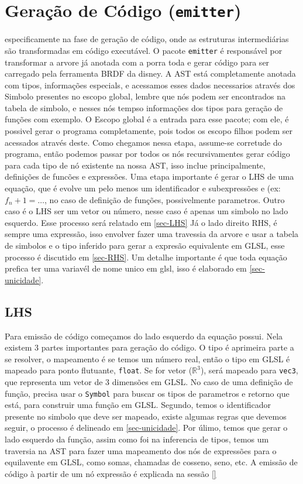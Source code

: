 
\section{Geração de Código (\texttt{emitter})}

especificamente na fase de geração de código, onde as estruturas intermediárias são transformadas em código executável.
O pacote \texttt{emitter} é responsável por transformar a arvore já anotada com a porra toda e gerar código para ser carregado pela ferramenta BRDF da disney.
A AST está completamente anotada com tipos, informações especials, e acessamos esses dados necessarios através dos Simbolo presentes no escopo global, lembre que nós podem ser encontrados na tabela de simbolo, e nesses nós tempso informações dos tipos para geração de funções com exemplo. O Escopo global é a entrada para esse pacote; com ele, é possivel gerar o programa completamente, pois todos os escopo filhos podem ser acessados através deste.
Como chegamos nessa etapa, assume-se corretude do programa, então podemos passar por todos os nós recursivamentes gerar código para cada tipo de nó existente na nossa AST, isso inclue principalmente, definições de funcões e expressões. Uma etapa importante é gerar o LHS de uma equação, que é evolve um pelo menos um identificador e subexpressões e (ex: $f_n+1 = \dots$, no caso de definição de funções, possivelmente parametros. Outro caso é o LHS ser um vetor ou número, nesse caso é apenas  um simbolo no lado esquerdo. 
Esse processo será relatado em \autoref{sec-LHS} Já o lado direito RHS, é sempre uma expressão, isso envolver fazer uma travessia da arvore e usar a tabela de simbolos e o tipo inferido para gerar a expresão equivalente em GLSL, esse processo é discutido em \autoref{sec-RHS}. Um detalhe importante é que toda equação prefica ter uma variavél de nome unico em glsl, isso é elaborado em \autoref{sec-unicidade}.


\subsection{LHS}
Para emissão de código começamos do lado esquerdo da equação possui. Nela existem 3 partes importantes para geração do código. O tipo é aprimeira parte a se resolver, o mapeamento é se temos um número real, então o tipo em GLSL é mapeado para ponto flutuante, \verb`float`. Se for vetor ($\mathbb{R}^3$), será mapeado para \verb`vec3`, que representa um vetor de 3 dimensões em GLSL. No caso de uma definição de função, precisa usar o \verb`Symbol` para buscar os tipos de parametros e retorno que está, para construir uma função em GLSL. Segundo, temos o identificador presente no simbolo que deve ser mapeado, existe algumas regras que devemos seguir, o processo é delineado em \autoref{sec-unicidade}. Por úlimo, temos que gerar o lado esquerdo da função, assim como foi na inferencia de tipos, temos um traversia na AST para fazer uma mapeamento dos nós de expressões para o equilavente em GLSL, como somas, chamadas de cosseno, seno, etc. A emissão de código à partir de um nó expressão é explicada na sessão \autoref{}

